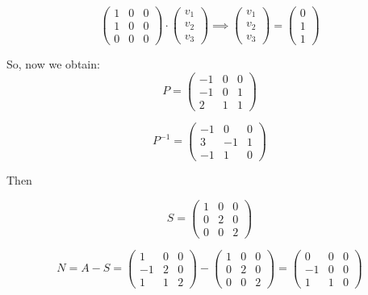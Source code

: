 \documentclass[12pt]{article}
\begin{document}
    $$
        \begin{pmatrix}
            1 & 0 & 0\\
            1 & 0 & 0\\
            0 & 0 & 0
        \end{pmatrix}\cdot
        \begin{pmatrix}
            v_1\\
            v_2\\
            v_3 
        \end{pmatrix}\implies
        \begin{pmatrix}
            v_1\\
            v_2\\
            v_3 
        \end{pmatrix}=
        \begin{pmatrix}
            0\\
            1\\
            1 
        \end{pmatrix}
    $$

    So, now we obtain:
    $$
        P =
        \begin{pmatrix}
            -1 & 0 & 0\\
            -1 & 0 & 1\\
             2 & 1 & 1
        \end{pmatrix}
    $$

    $$
        P^{-1} =
        \begin{pmatrix}
            -1 &  0 & 0\\
             3 & -1 & 1\\
            -1 &  1 & 0
        \end{pmatrix}
    $$
    
    Then

    $$
        S =
        \begin{pmatrix}
            1  & 0 &  0\\
            0 & 2 &  0\\
            0  & 0 &  2
        \end{pmatrix}
    $$

    $$
        N = A - S =
        \begin{pmatrix}
            1 & 0 & 0\\
            -1 & 2 & 0\\
            1 & 1 & 2
        \end{pmatrix} -
        \begin{pmatrix}
            1  & 0 &  0\\
            0 & 2 &  0\\
            0  & 0 &  2
        \end{pmatrix} =
        \begin{pmatrix}
            0  & 0 &  0\\
            -1 & 0 &  0\\
            1  & 1 &  0
        \end{pmatrix}
    $$
    
\end{document}
